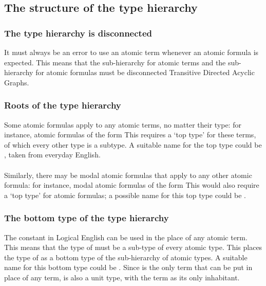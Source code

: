 \documentclass[../main.tex]{subfiles}
\begin{document}
\subsection{The structure of the type hierarchy}
\subsubsection{The type hierarchy is disconnected}
It must always be an error to use an atomic term whenever an atomic formula is expected. This means that the sub-hierarchy for atomic terms and the sub-hierarchy for atomic formulas must be disconnected Transitive Directed Acyclic Graphs. 

\subsubsection{Roots of the type hierarchy}
Some atomic formulas apply to any atomic terms, no matter their type: for instance, atomic formulas of the form  This requires a `top type' for these terms, of which every other type is a subtype. A suitable name for the top type could be , taken from everyday English. 
\\
\\
Similarly, there may be modal atomic formulas that apply to any other atomic formula: for instance, modal atomic formulas of the form  This would also require a `top type' for atomic formulas; a possible name for this top type could be .

\subsubsection{The bottom type of the type hierarchy}
The constant  in Logical English can be used in the place of any atomic term.
This means that the type of  must be a sub-type of every atomic type. This places the type of  as a bottom type of the sub-hierarchy of atomic types. A suitable name for this bottom type could be . Since  is the only term that can be put in place of any term,  is also a unit type, with the term  as its only inhabitant.

\end{document}
